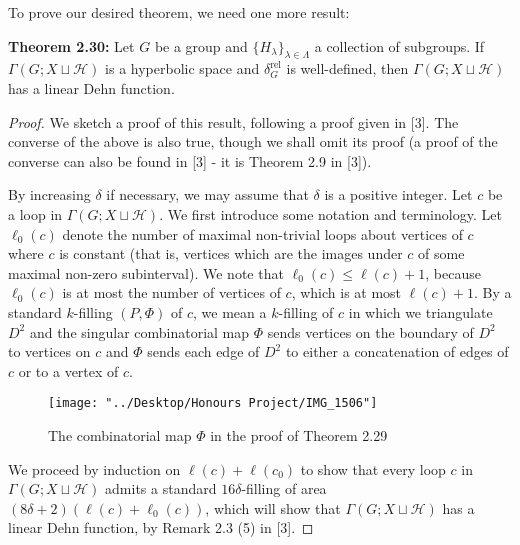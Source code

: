 \documentclass[12pt]{article}
\newcommand{\vs}{\vskip10pt}
\begin{document}
	To prove our desired theorem, we need one more result:
	
	\vs 
	
	\textbf{Theorem 2.30: } Let $G$ be a group and $\{H_{\lambda}\}_{\lambda \in \Lambda}$ a collection of subgroups. If $\Gamma(G; X \sqcup \mathcal{H})$ is a hyperbolic space and $\delta^{\text{rel}}_G$ is well-defined, then $\Gamma(G; X \sqcup \mathcal{H})$ has a linear Dehn function. 
	
	\begin{proof}
		
		We sketch a proof of this result, following a proof given in [3]. The converse of the above is also true, though we shall omit its proof (a proof of the converse can also be found in [3] - it is Theorem 2.9 in [3]). 
		
		\vs 
		
		By increasing $\delta$ if necessary, we may assume that $\delta$ is a positive integer. Let $c$ be a loop in $\Gamma(G; X \sqcup \mathcal{H})$. We first introduce some notation and terminology. Let $\ell_0(c)$ denote the number of maximal non-trivial loops about vertices of $c$ where $c$ is constant (that is, vertices which are the images under $c$ of some maximal non-zero subinterval). We note that $\ell_0(c) \leq \ell(c) + 1$, because $\ell_0(c)$ is at most the number of vertices of $c$, which is at most $\ell(c) + 1$. By a standard $k$-filling $(P, \Phi)$ of $c$, we mean a $k$-filling of $c$ in which we triangulate $D^2$ and the singular combinatorial map $\Phi$ sends vertices on the boundary of $D^2$ to vertices on $c$ and $\Phi$ sends each edge of $D^2$ to either a concatenation of edges of $c$ or to a vertex of $c$. 
		
	
\begin{figure} [H]
	\centering
	\texttt{[image: "../Desktop/Honours Project/IMG\_1506"]}
	\caption{ The combinatorial map $\Phi$ in the proof of Theorem 2.29}
	\label{fig:img1506}
\end{figure}
		
		\vs 
		
		We proceed by induction on $\ell(c) + \ell(c_0)$ to show that every loop $c$ in $\Gamma(G; X \sqcup \mathcal{H})$ admits a standard $16\delta$-filling of area $(8 \delta + 2)(\ell(c) + \ell_0(c))$, which will show that $\Gamma(G; X \sqcup \mathcal{H})$ has a linear Dehn function, by Remark 2.3 (5) in [3]. 
		
		\vs 
		

\end{proof}
\end{document}
